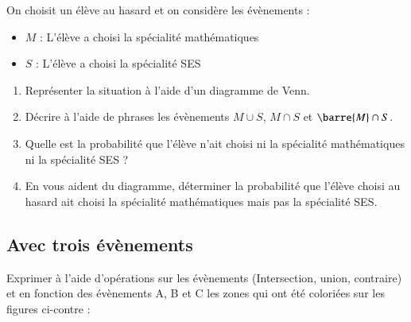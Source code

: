 \documentclass[oneside,12pt]{article}          %
\begin{document}
On choisit un élève au hasard et on considère les évènements :
\begin{itemize}[label=$\bullet$]
    \item $M$ : \og L'élève a choisi la spécialité mathématiques \fg
    \item $S$ : \og L'élève a choisi la spécialité SES \fg
\end{itemize}
\begin{enumerate}
    \item Représenter la situation à l'aide d'un diagramme de Venn.
    \item Décrire à l'aide de phrases les évènements $M\cup S$, $M\cap S$ et $\barre{M} \cap S$.
    \item Quelle est la probabilité que l'élève n'ait choisi ni la spécialité mathématiques ni la spécialité SES ?
    \item En vous aident du diagramme, déterminer la probabilité que l'élève choisi au hasard ait choisi la spécialité mathématiques mais pas la spécialité SES.
\end{enumerate}



\subsection{Avec trois évènements}
Exprimer à l'aide d'opérations sur les évènements (Intersection, union, contraire) et en fonction des évènements A, B et C les zones qui ont été coloriées sur les figures ci-contre :

 \hspace{5mm}
 \hspace{5mm}
 \hspace{5mm}
\end{document}
